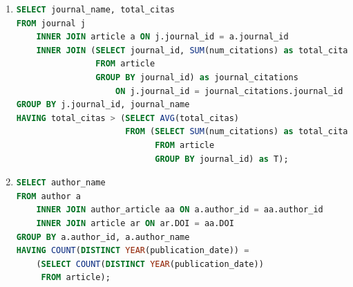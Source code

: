 \documentclass{db-practice}
\begin{document}
\begin{enumerate}
\item
\begin{lstlisting}[language=SQL]
SELECT journal_name, total_citas
FROM journal j 
    INNER JOIN article a ON j.journal_id = a.journal_id
    INNER JOIN (SELECT journal_id, SUM(num_citations) as total_citas
                FROM article
                GROUP BY journal_id) as journal_citations 
                    ON j.journal_id = journal_citations.journal_id
GROUP BY j.journal_id, journal_name
HAVING total_citas > (SELECT AVG(total_citas)
                      FROM (SELECT SUM(num_citations) as total_citas
                            FROM article
                            GROUP BY journal_id) as T);
\end{lstlisting}

\item
\begin{lstlisting}[language=SQL]
SELECT author_name
FROM author a 
    INNER JOIN author_article aa ON a.author_id = aa.author_id
    INNER JOIN article ar ON ar.DOI = aa.DOI
GROUP BY a.author_id, a.author_name
HAVING COUNT(DISTINCT YEAR(publication_date)) = 
    (SELECT COUNT(DISTINCT YEAR(publication_date))
     FROM article);
\end{lstlisting}
\end{enumerate}
\end{document}
